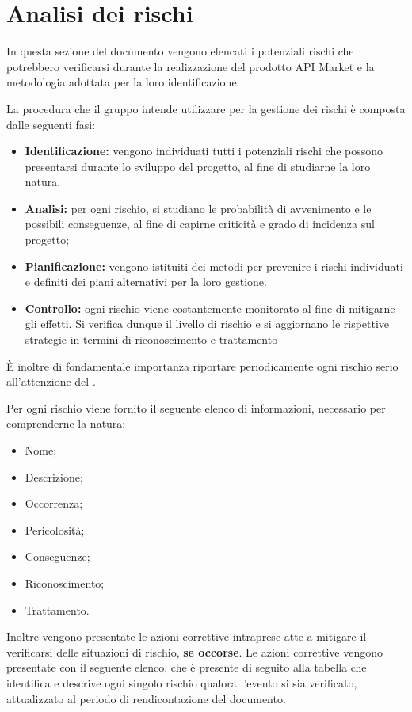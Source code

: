 \newpage


\section{Analisi dei rischi}
In questa sezione del documento vengono elencati i potenziali rischi che potrebbero verificarsi durante la realizzazione del prodotto API Market e la metodologia adottata per la loro identificazione.

La procedura che il gruppo \textit{\gruppo} intende utilizzare per la gestione dei rischi è composta dalle seguenti fasi:
\begin{itemize}
	\item \textbf{Identificazione:} vengono individuati tutti i potenziali rischi che possono presentarsi durante lo sviluppo del progetto, al fine di studiarne la loro natura. 
	\item \textbf{Analisi:} per ogni rischio, si studiano le probabilità di avvenimento e le possibili conseguenze, al fine di capirne criticità e grado di incidenza sul progetto;
	\item \textbf{Pianificazione:} vengono istituiti dei metodi per prevenire i rischi individuati e definiti dei piani alternativi per la loro gestione.
	\item \textbf{Controllo:} ogni rischio viene costantemente monitorato al fine di mitigarne gli effetti. Si verifica dunque il livello di rischio e si aggiornano le rispettive strategie in termini di riconoscimento e trattamento
\end{itemize}

\MakeUppercase{è} inoltre di fondamentale importanza riportare periodicamente ogni rischio serio all'attenzione del \textit{\RdP}.


Per ogni rischio viene fornito il seguente elenco di informazioni, necessario per comprenderne la natura:
\begin{itemize}
	\item Nome;
	\item Descrizione;
	\item Occorrenza;
	\item Pericolosità;
	\item Conseguenze;
	\item Riconoscimento;
	\item Trattamento.
\end{itemize}

Inoltre vengono presentate le azioni correttive intraprese atte a mitigare il verificarsi delle situazioni di rischio, \textbf{se occorse}. Le azioni correttive vengono presentate con il seguente elenco, che è presente di seguito alla tabella che identifica e descrive ogni singolo rischio qualora l'evento si sia verificato, attualizzato al periodo di rendicontazione del documento.

